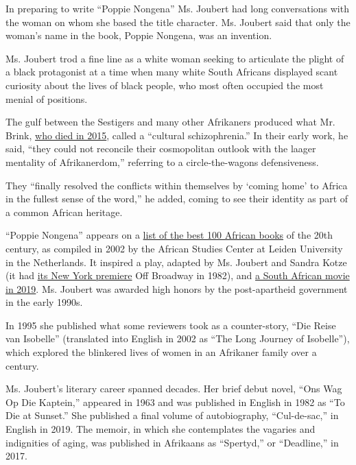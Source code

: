 In preparing to write ``Poppie Nongena'' Ms. Joubert had long
conversations with the woman on whom she based the title character. Ms.
Joubert said that only the woman's name in the book, Poppie Nongena, was
an invention.

Ms. Joubert trod a fine line as a white woman seeking to articulate the
plight of a black protagonist at a time when many white South Africans
displayed scant curiosity about the lives of black people, who most
often occupied the most menial of positions.

The gulf between the Sestigers and many other Afrikaners produced what
Mr. Brink,
\href{https://www.nytimes.com/2015/02/08/books/andre-brink-south-african-literary-figure-who-ran-afoul-of-censors-dies-at-79.html}{who
died in 2015}, called a ``cultural schizophrenia.'' In their early work,
he said, ``they could not reconcile their cosmopolitan outlook with the
laager mentality of Afrikanerdom,'' referring to a circle-the-wagons
defensiveness.

They ``finally resolved the conflicts within themselves by `coming home'
to Africa in the fullest sense of the word,'' he added, coming to see
their identity as part of a common African heritage.

``Poppie Nongena'' appears on a
\href{https://www.ascleiden.nl/content/webdossiers/africas-100-best-books-20th-century}{list
of the best 100 African books} of the 20th century, as compiled in 2002
by the African Studies Center at Leiden University in the Netherlands.
It inspired a play, adapted by Ms. Joubert and Sandra Kotze (it had
\href{https://www.nytimes.com/1982/03/28/theater/theater-the-long-journey-of-poppie-nongena.html}{its
New York premiere} Off Broadway in 1982), and
\href{https://www.imdb.com/title/tt9248912/?ref_=ttfc_fc_tt}{a South
African movie in 2019}. Ms. Joubert was awarded high honors by the
post-apartheid government in the early 1990s.

In 1995 she published what some reviewers took as a counter-story, ``Die
Reise van Isobelle'' (translated into English in 2002 as ``The Long
Journey of Isobelle''), which explored the blinkered lives of women in
an Afrikaner family over a century.

Ms. Joubert's literary career spanned decades. Her brief debut novel,
``Ons Wag Op Die Kaptein,'' appeared in 1963 and was published in
English in 1982 as ``To Die at Sunset.'' She published a final volume of
autobiography, ``Cul-de-sac,'' in English in 2019. The memoir, in which
she contemplates the vagaries and indignities of aging, was published in
Afrikaans as ``Spertyd,'' or ``Deadline,'' in 2017.

